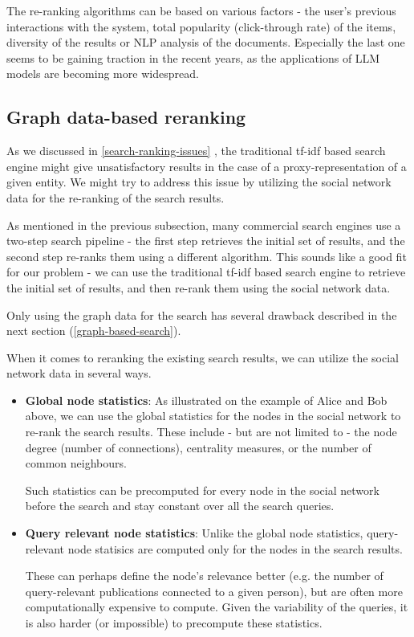 The re-ranking algorithms can be based on various factors - the user's previous interactions with the system, total popularity (click-through rate) of the items,
diversity of the results %
or NLP analysis of the documents. Especially the last one seems to be gaining traction in the recent years, as the applications of LLM models are becoming more widespread.

\subsection{Graph data-based reranking}

As we discussed in \ref{search-ranking-issues}
, the traditional tf-idf based search engine might give unsatisfactory results in the case 
of a proxy-representation of a given entity.
We might try to address this issue by utilizing the social network data for the re-ranking of the search results.

As mentioned in the previous subsection, many commercial search engines use a two-step search pipeline - the first step retrieves the initial set of results,
and the second step re-ranks them using a different algorithm. This sounds like a good fit for our problem - we can use the traditional tf-idf based search engine 
to retrieve the initial set of results, and then re-rank them using the social network data. 

Only using the graph data for the search has several drawback described in the next section (\ref{graph-based-search}).

When it comes to reranking the existing search results, we can utilize the social network data in several ways.

\begin{itemize}
    \item \textbf{Global node statistics}: As illustrated on the example of Alice and Bob above, 
    we can use the global statistics for the nodes in the social network to re-rank the search results. 
    These include - but are not limited to - the node degree (number of connections), centrality measures, or the number of common neighbours.

    Such statistics can be precomputed for every node in the social network before the search and stay constant over all the search queries.

    \item \textbf{Query relevant node statistics}: Unlike the global node statistics, query-relevant node statisics are computed only for the nodes in the search results.
    
    These can perhaps define the node's relevance better (e.g. the number of query-relevant publications connected to a given person), but are often more computationally expensive to compute.
    Given the variability of the queries, it is also harder (or impossible) to precompute these statistics.
\end{itemize}

